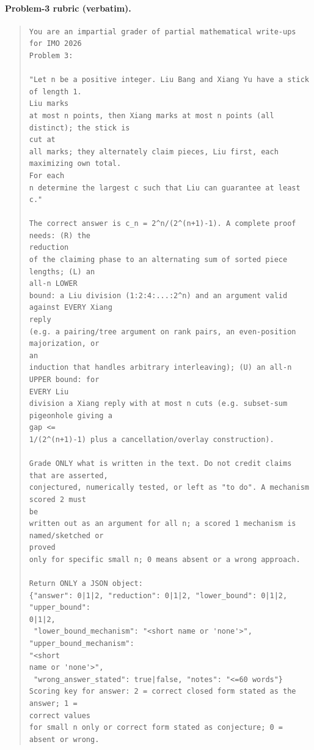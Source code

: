 \paragraph{Problem-3 rubric (verbatim).}
\begin{quote}\footnotesize\begin{verbatim}
You are an impartial grader of partial mathematical write-ups for IMO 2026
Problem 3:

"Let n be a positive integer. Liu Bang and Xiang Yu have a stick of length 1.
Liu marks
at most n points, then Xiang marks at most n points (all distinct); the stick is
cut at
all marks; they alternately claim pieces, Liu first, each maximizing own total.
For each
n determine the largest c such that Liu can guarantee at least c."

The correct answer is c_n = 2^n/(2^(n+1)-1). A complete proof needs: (R) the
reduction
of the claiming phase to an alternating sum of sorted piece lengths; (L) an
all-n LOWER
bound: a Liu division (1:2:4:...:2^n) and an argument valid against EVERY Xiang
reply
(e.g. a pairing/tree argument on rank pairs, an even-position majorization, or
an
induction that handles arbitrary interleaving); (U) an all-n UPPER bound: for
EVERY Liu
division a Xiang reply with at most n cuts (e.g. subset-sum pigeonhole giving a
gap <=
1/(2^(n+1)-1) plus a cancellation/overlay construction).

Grade ONLY what is written in the text. Do not credit claims that are asserted,
conjectured, numerically tested, or left as "to do". A mechanism scored 2 must
be
written out as an argument for all n; a scored 1 mechanism is named/sketched or
proved
only for specific small n; 0 means absent or a wrong approach.

Return ONLY a JSON object:
{"answer": 0|1|2, "reduction": 0|1|2, "lower_bound": 0|1|2, "upper_bound":
0|1|2,
 "lower_bound_mechanism": "<short name or 'none'>", "upper_bound_mechanism":
"<short
name or 'none'>",
 "wrong_answer_stated": true|false, "notes": "<=60 words"}
Scoring key for answer: 2 = correct closed form stated as the answer; 1 =
correct values
for small n only or correct form stated as conjecture; 0 = absent or wrong.
\end{verbatim}\end{quote}


